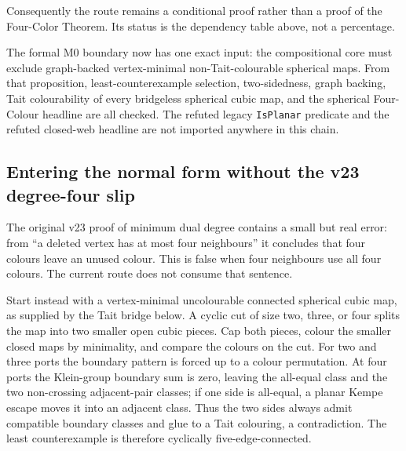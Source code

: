 Consequently the route remains a conditional proof rather than a proof of the
Four-Color Theorem.  Its status is the dependency table above, not a percentage.

The formal M0 boundary now has one exact input: the compositional core must
exclude graph-backed vertex-minimal non-Tait-colourable spherical maps.
From that proposition, least-counterexample selection, two-sidedness, graph
backing, Tait colourability of every bridgeless spherical cubic map, and the
spherical Four-Colour headline are all checked.
The refuted legacy \texttt{IsPlanar} predicate and the refuted closed-web
headline are not imported anywhere in this chain.

\subsection{Entering the normal form without the v23 degree-four slip}

The original v23 proof of minimum dual degree contains a small but real error:
from ``a deleted vertex has at most four neighbours'' it concludes that four
colours leave an unused colour.  This is false when four neighbours use all
four colours.  The current route does not consume that sentence.

Start instead with a vertex-minimal uncolourable connected spherical cubic
map, as supplied by the Tait bridge below.  A cyclic cut of size two, three, or
four splits the map into two smaller open cubic pieces.  Cap both pieces,
colour the smaller closed maps by minimality, and compare the colours on the
cut.  For two and three ports the boundary pattern is forced up to a colour
permutation.  At four ports the Klein-group boundary sum is zero, leaving the
all-equal class and the two non-crossing adjacent-pair classes; if one side is
all-equal, a planar Kempe escape moves it into an adjacent class.  Thus the
two sides always admit compatible boundary classes and glue to a Tait
colouring, a contradiction.  The least counterexample is therefore
cyclically five-edge-connected.

